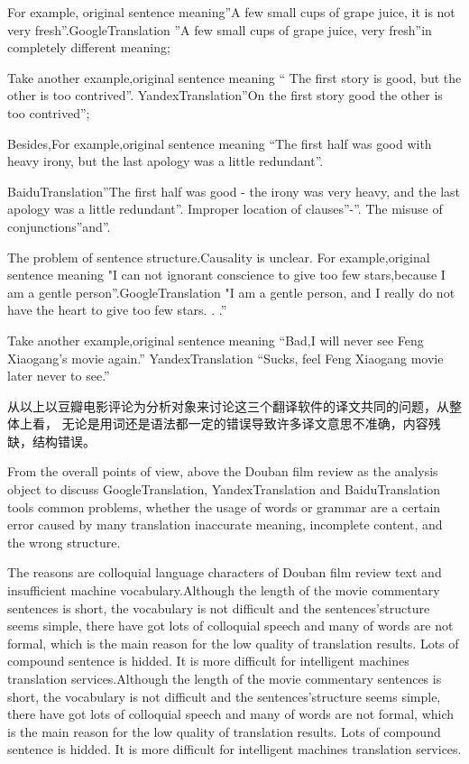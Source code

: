 \documentclass[conference]{IEEEtran}
\begin{document}
\begin{CJK*}{UTF8}{gbsn}
For example, original sentence meaning”A few small cups of grape
juice, it is not very fresh”.GoogleTranslation ”A few small cups of grape juice,
very fresh”in completely different meaning;


Take another example,original
sentence meaning “ The first story is good, but the other is too
contrived”.
YandexTranslation”On the first story good the other is too
contrived”;


Besides,For example,original sentence meaning “The first half was
good with heavy irony, but the last apology was a little
redundant”.

BaiduTranslation”The first half was good - the irony was very heavy,
and the last apology was a little redundant”. Improper location of clauses”-”.
The misuse of conjunctions”and”.

The problem of sentence structure.Causality is unclear. For example,original
sentence meaning "I can not ignorant conscience to give too few stars,because I
am a gentle person”.GoogleTranslation "I am a gentle person, and I really do not
have the heart to give too few stars. . .”

Take another example,original sentence meaning “Bad,I will never see Feng
Xiaogang's movie again.”  YandexTranslation “Sucks, feel Feng Xiaogang movie
later never to see.”


从以上以豆瓣电影评论为分析对象来讨论这三个翻译软件的译文共同的问题，从整体上看，
无论是用词还是语法都一定的错误导致许多译文意思不准确，内容残缺，结构错误。

 From the overall points of view, above the Douban film review as the analysis
 object to discuss GoogleTranslation, YandexTranslation and BaiduTranslation
 tools common problems, whether the usage of words or grammar are a certain
 error caused by many translation inaccurate meaning, incomplete content, and
 the wrong structure.

 The reasons are colloquial language characters of Douban film review text and
 insufficient machine vocabulary.Although the length of the movie commentary
 sentences is short, the vocabulary is not difficult and the sentences’structure
 seems simple, there have got lots of colloquial speech and many of words are
 not formal, which is the main reason for the low quality of translation
 results. Lots of compound sentence is hidded. It is more difficult for
 intelligent machines translation services.Although the length of the movie
 commentary sentences is short, the vocabulary is not difficult and the
 sentences’structure seems simple, there have got lots of colloquial speech and
 many of words are not formal, which is the main reason for the low quality of
 translation results. Lots of compound sentence is hidded. It is more difficult
 for intelligent machines translation services.


\end{CJK*}
\end{document}
